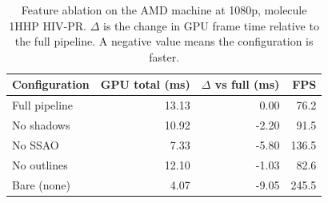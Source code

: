 \begin{table}[H]
    \centering
    \small
    \begin{tabular}{lrrr}
        \toprule
        Configuration & GPU total (ms) & $\Delta$ vs full (ms) & FPS \\
        \midrule
        Full pipeline & 13.13 & 0.00 & 76.2 \\
        No shadows & 10.92 & -2.20 & 91.5 \\
        No SSAO & 7.33 & -5.80 & 136.5 \\
        No outlines & 12.10 & -1.03 & 82.6 \\
        Bare (none) & 4.07 & -9.05 & 245.5 \\
        \bottomrule
    \end{tabular}
    \caption{Feature ablation on the AMD machine at 1080p, molecule 1HHP HIV-PR. $\Delta$ is the change in GPU frame time relative to the full pipeline. A negative value means the configuration is faster.}
    \label{tab:ablation_amd}
\end{table}
